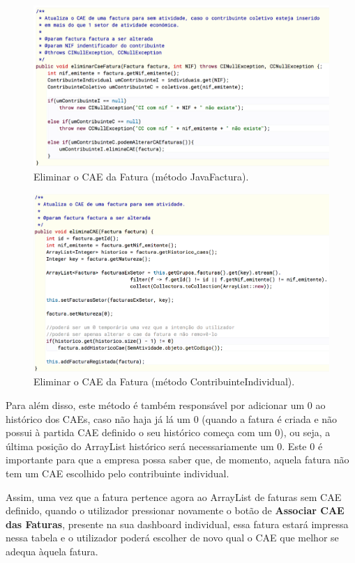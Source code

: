 \documentclass[a4paper]{article}
\begin{document}
\begin{itemize}
\begin{figure}[H]
\centering
\includegraphics[scale=0.35]{imgs/eliminarCaeFatura.png}
\caption{Eliminar o CAE da Fatura (método JavaFactura).}
\label{img:eliminarCaeFatura}
\end{figure}

\begin{figure}[H]
\centering
\includegraphics[scale=0.35]{imgs/eliminaCAE.png}
\caption{Eliminar o CAE da Fatura (método ContribuinteIndividual).}
\label{img:eliminaCAE}
\end{figure}

Para além disso, este método é também responsável por adicionar um 0 ao histórico dos CAEs, caso
não haja já lá um 0 (quando a fatura é criada e não possui à partida CAE definido o seu
histórico começa com um 0), ou seja, a última posição do ArrayList histórico será necessariamente
um 0. Este 0 é importante para que a empresa possa saber que, de momento, aquela fatura não tem
um CAE escolhido pelo contribuinte individual.

Assim, uma vez que a fatura pertence agora ao ArrayList de faturas sem CAE definido, quando
o utilizador pressionar novamente o botão de \textbf{Associar CAE das Faturas}, presente
na sua dashboard individual, essa fatura
estará impressa nessa tabela e o utilizador poderá escolher de novo qual o CAE que melhor se
adequa àquela fatura.


\end{itemize}
\end{document}
